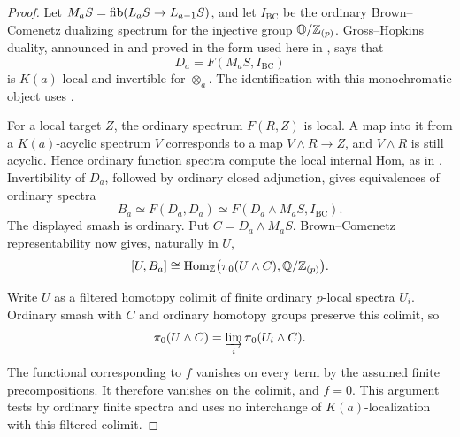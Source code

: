\begin{proof}
Let \(M_aS=\operatorname{fib}(L_aS\to L_{a-1}S)\), and let \(I_{\mathrm{BC}}\)
be the ordinary Brown--Comenetz dualizing spectrum for the injective
group \(\mathbb Q/\mathbb Z_{(p)}\). Gross--Hopkins duality, announced in
\cite[Theorem~6]{gross-hopkins1994} and proved in the form used here
in \cite[Theorem~10.2(b),(e)]{hs1999}, says that
\[
 D_a=F(M_aS,I_{\mathrm{BC}})
\]
is \(K(a)\)-local and invertible for \(\otimes_a\). The
identification with this monochromatic object uses
\cite[Theorem~6.19]{hs1999}.

For a local target \(Z\), the ordinary spectrum \(F(R,Z)\) is
local. A map into it from a \(K(a)\)-acyclic spectrum \(V\)
corresponds to a map \(V\wedge R\to Z\), and \(V\wedge R\) is
still acyclic. Hence ordinary function spectra compute the local
internal Hom, as in \cite[Theorem~7.1]{hs1999}. Invertibility of
\(D_a\), followed by ordinary closed adjunction, gives equivalences
of ordinary spectra
\[
 B_a\simeq F(D_a,D_a)
       \simeq F(D_a\wedge M_aS,I_{\mathrm{BC}}).
\]
The displayed smash is ordinary. Put \(C=D_a\wedge M_aS\).
Brown--Comenetz representability now gives, naturally in \(U\),
\[
 [U,B_a]\cong
 \operatorname{Hom}_{\mathbb Z}\bigl(\pi_0(U\wedge C),\mathbb Q/\mathbb Z_{(p)}\bigr).
\]

Write \(U\) as a filtered homotopy colimit of finite ordinary
\(p\)-local spectra \(U_i\). Ordinary smash with \(C\) and ordinary
homotopy groups preserve this colimit, so
\[
 \pi_0(U\wedge C)=\varinjlim_i\pi_0(U_i\wedge C).
\]
The functional corresponding to \(f\) vanishes on every term by
the assumed finite precompositions. It therefore vanishes on the
colimit, and \(f=0\). This argument tests by ordinary finite
spectra and uses no interchange of \(K(a)\)-localization with
this filtered colimit.
\end{proof}

